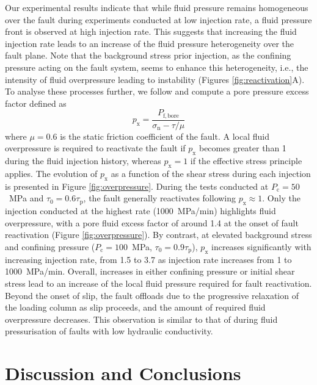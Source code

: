 \documentclass[grl]{agutex2arxiv}
\begin{document}
\begin{article}
Our experimental results indicate that while fluid pressure remains homogeneous over the fault during experiments conducted at low injection rate, a fluid pressure front is observed at high injection rate. This suggests that increasing the fluid injection rate leads to an increase of the fluid pressure heterogeneity over the fault plane. Note that the background stress prior injection, as the confining pressure acting on the fault system, seems to enhance this heterogeneity, i.e., the intensity of fluid overpressure leading to instability (Figures \ref{fig:reactivation}A). To analyse these processes further, we follow \citet{Rutter2017} and compute a pore pressure excess factor defined as
\begin{equation}
  \label{eq:px}
  p_\mathrm{x}=\frac{P_\mathrm{f,bore}}{\sigma_\mathrm{n}-\tau/\mu}
\end{equation}
where $\mu=0.6$ is the static friction coefficient of the fault. A local fluid overpressure is required to reactivate the fault if $p_\mathrm{x}$ becomes greater than 1 during the fluid injection history, whereas $p_\mathrm{x}=1$ if the effective stress principle applies. The evolution of $p_\mathrm{x}$ as a function of the shear stress during each injection is presented in Figure \ref{fig:overpressure}. During the tests conducted at $P_\mathrm{c}=50$~MPa and $\tau_0=0.6\tau_\mathrm{p}$, the fault generally reactivates following $p_\mathrm{x}\approx 1$. Only the injection conducted at the highest rate (1000~MPa/min) highlights fluid overpressure, with a pore fluid excess factor of around 1.4 at the onset of fault reactivation (Figure \ref{fig:overpressure}). By contrast, at elevated background stress and confining pressure ($P_\mathrm{c}=100$~MPa, $\tau_0=0.9\tau_\mathrm{p}$), $p_\mathrm{x}$ increases significantly with increasing injection rate, from 1.5 to 3.7 as injection rate increases from 1 to 1000~MPa/min. Overall, increases in either confining pressure or initial shear stress lead to an increase of the local fluid pressure required for fault reactivation. Beyond the onset of slip, the fault offloads due to the progressive relaxation of the loading column as slip proceeds, and the amount of required fluid overpressure decreases. This observation is similar to that of \citet{Rutter2017} during fluid pressurisation of faults with low hydraulic conductivity. 





\section{Discussion and Conclusions}


\end{article}
\end{document}
